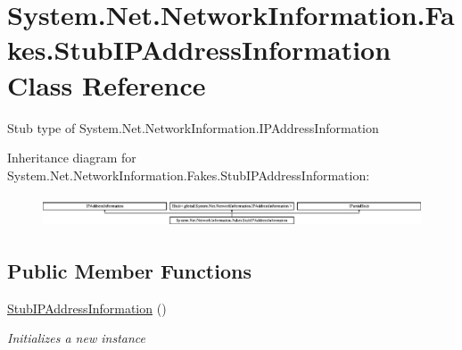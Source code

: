 \hypertarget{class_system_1_1_net_1_1_network_information_1_1_fakes_1_1_stub_i_p_address_information}{\section{System.\-Net.\-Network\-Information.\-Fakes.\-Stub\-I\-P\-Address\-Information Class Reference}
\label{class_system_1_1_net_1_1_network_information_1_1_fakes_1_1_stub_i_p_address_information}
}


Stub type of System.\-Net.\-Network\-Information.\-I\-P\-Address\-Information 


Inheritance diagram for System.\-Net.\-Network\-Information.\-Fakes.\-Stub\-I\-P\-Address\-Information\-:\begin{figure}[H]
\begin{center}
\leavevmode
\includegraphics[height=0.912795cm]{class_system_1_1_net_1_1_network_information_1_1_fakes_1_1_stub_i_p_address_information}
\end{center}
\end{figure}
\subsection*{Public Member Functions}
\begin{DoxyCompactItemize}
\item 
\hyperlink{class_system_1_1_net_1_1_network_information_1_1_fakes_1_1_stub_i_p_address_information_a74b21d63d97624e0f43fac5f60af2412}{Stub\-I\-P\-Address\-Information} ()
\begin{DoxyCompactList}\small\item\em Initializes a new instance\end{DoxyCompactList}\end{DoxyCompactItemize}
